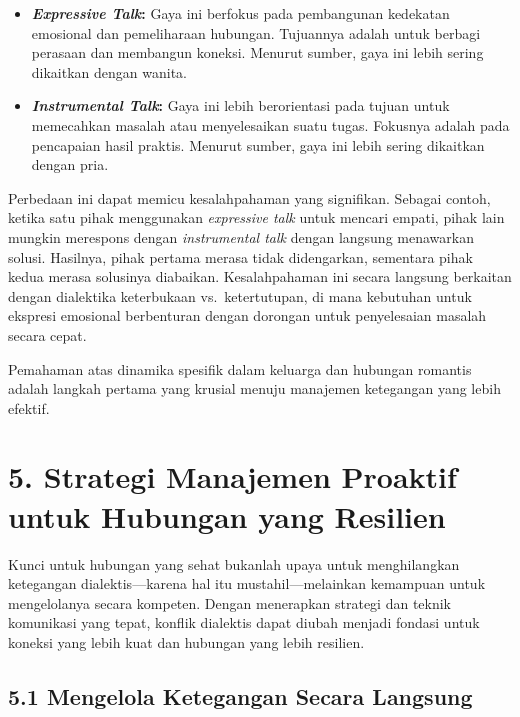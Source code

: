 \documentclass[
  letterpaper,
  DIV=11,
  numbers=noendperiod]{scrreprt}
\providecommand{\tightlist}{%
  \setlength{\itemsep}{0pt}\setlength{\parskip}{0pt}}
\begin{document}
\begin{itemize}
\tightlist
\item
  \emph{\textbf{Expressive Talk}}\textbf{:} Gaya ini berfokus pada
  pembangunan kedekatan emosional dan pemeliharaan hubungan. Tujuannya
  adalah untuk berbagi perasaan dan membangun koneksi. Menurut sumber,
  gaya ini lebih sering dikaitkan dengan wanita.
\item
  \emph{\textbf{Instrumental Talk}}\textbf{:} Gaya ini lebih
  berorientasi pada tujuan untuk memecahkan masalah atau menyelesaikan
  suatu tugas. Fokusnya adalah pada pencapaian hasil praktis. Menurut
  sumber, gaya ini lebih sering dikaitkan dengan pria.
\end{itemize}

Perbedaan ini dapat memicu kesalahpahaman yang signifikan. Sebagai
contoh, ketika satu pihak menggunakan \emph{expressive talk} untuk
mencari empati, pihak lain mungkin merespons dengan \emph{instrumental
talk} dengan langsung menawarkan solusi. Hasilnya, pihak pertama merasa
tidak didengarkan, sementara pihak kedua merasa solusinya diabaikan.
Kesalahpahaman ini secara langsung berkaitan dengan dialektika
keterbukaan vs.~ketertutupan, di mana kebutuhan untuk ekspresi emosional
berbenturan dengan dorongan untuk penyelesaian masalah secara cepat.

Pemahaman atas dinamika spesifik dalam keluarga dan hubungan romantis
adalah langkah pertama yang krusial menuju manajemen ketegangan yang
lebih efektif.

\section{\texorpdfstring{\textbf{5. Strategi Manajemen Proaktif untuk
Hubungan yang
Resilien}}{5. Strategi Manajemen Proaktif untuk Hubungan yang Resilien}}\label{strategi-manajemen-proaktif-untuk-hubungan-yang-resilien}

Kunci untuk hubungan yang sehat bukanlah upaya untuk menghilangkan
ketegangan dialektis---karena hal itu mustahil---melainkan kemampuan
untuk mengelolanya secara kompeten. Dengan menerapkan strategi dan
teknik komunikasi yang tepat, konflik dialektis dapat diubah menjadi
fondasi untuk koneksi yang lebih kuat dan hubungan yang lebih resilien.

\subsection{\texorpdfstring{\textbf{5.1 Mengelola Ketegangan Secara
Langsung}}{5.1 Mengelola Ketegangan Secara Langsung}}\label{mengelola-ketegangan-secara-langsung}
\end{document}
